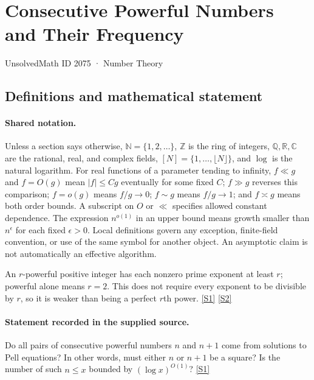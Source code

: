 \documentclass[11pt,a4paper]{article}
\newcommand{\N}{\mathbb{N}}
\newcommand{\Z}{\mathbb{Z}}
\newcommand{\Q}{\mathbb{Q}}
\newcommand{\R}{\mathbb{R}}
\newcommand{\C}{\mathbb{C}}
\newcommand{\sref}[2]{\hyperlink{source:#1:#2}{[S#2]}}
\begin{document}

\setcounter{section}{2074}

\section{Consecutive Powerful Numbers and Their Frequency}\label{2075}

{\small\sffamily UnsolvedMath ID 2075 · Number Theory}

\subsection{Definitions and mathematical statement}

\paragraph{Shared notation.}Unless a section says otherwise, $\N=\{1,2,\ldots\}$,
$\Z$ is the ring of integers, $\Q,\R,\C$ are the rational, real, and complex
fields, $[N]=\{1,\ldots,\lfloor N\rfloor\}$, and $\log$ is the natural
logarithm. For real functions of a parameter tending to infinity,
$f\ll g$ and $f=O(g)$ mean $|f|\leq Cg$ eventually for some fixed $C$;
$f\gg g$ reverses this comparison; $f=o(g)$ means $f/g\to0$;
$f\sim g$ means $f/g\to1$; and $f\asymp g$ means both order bounds.
A subscript on $O$ or $\ll$ specifies allowed constant dependence.
The expression $n^{o(1)}$ in an upper bound means growth smaller than
$n^\epsilon$ for each fixed $\epsilon>0$. Local definitions govern any
exception, finite-field convention, or use of the same symbol for another
object. An asymptotic claim is not automatically an effective algorithm.



An $r$-powerful positive integer has each nonzero prime exponent at least $r$; powerful alone means $r=2$. This does not require every exponent to be divisible by $r$, so it is weaker than being a perfect $r$th power. \sref{2075}{1} \sref{2075}{2}

\paragraph{Statement recorded in the supplied source.}
Do all pairs of consecutive powerful numbers $n$ and $n+1$ come from solutions to Pell equations? In other words, must either $n$ or $n+1$ be a square?
Is the number of such $n\leq x$ bounded by $(\log x)^{O(1)}$? \sref{2075}{1}
\end{document}
